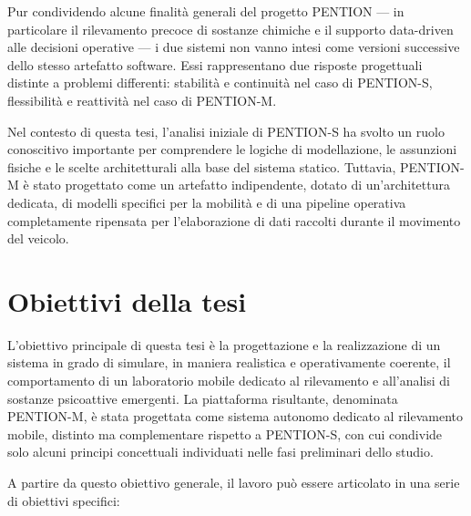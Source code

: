 Pur condividendo alcune finalità generali del progetto \textsc{PENTION} — in particolare il rilevamento precoce di sostanze chimiche e il supporto data-driven alle decisioni operative — i due sistemi non vanno intesi come versioni successive dello stesso artefatto software. Essi rappresentano due risposte progettuali distinte a problemi differenti: stabilità e continuità nel caso di \textsc{PENTION-S}, flessibilità e reattività nel caso di \textsc{PENTION-M}.

Nel contesto di questa tesi, l’analisi iniziale di \textsc{PENTION-S} ha svolto un ruolo conoscitivo importante per comprendere le logiche di modellazione, le assunzioni fisiche e le scelte architetturali alla base del sistema statico. Tuttavia, \textsc{PENTION-M} è stato progettato come un artefatto indipendente, dotato di un’architettura dedicata, di modelli specifici per la mobilità e di una pipeline operativa completamente ripensata per l’elaborazione di dati raccolti durante il movimento del veicolo.

\section{Obiettivi della tesi}

L'obiettivo principale di questa tesi è la progettazione e la realizzazione di un sistema in grado di simulare, in maniera realistica e operativamente coerente, il comportamento di un laboratorio mobile dedicato al rilevamento e all’analisi di sostanze psicoattive emergenti.
La piattaforma risultante, denominata \textsc{PENTION-M}, è stata progettata come sistema autonomo dedicato al rilevamento mobile, distinto ma complementare rispetto a \textsc{PENTION-S}, con cui condivide solo alcuni principi concettuali individuati nelle fasi preliminari dello studio.

A partire da questo obiettivo generale, il lavoro può essere articolato in una serie di obiettivi specifici:

